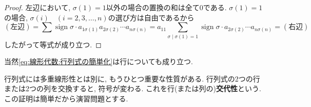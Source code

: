 \documentclass[a4j,dvipdfmx]{jsarticle}
\numberwithin{equation}{section}
\newcommand{\sign}{\mathop{\mathrm{sign}}\nolimits}
\begin{document}
            \begin{proof}
                左辺において, $\sigma(1)=1$以外の場合の置換の和は全て0である. $\sigma(1)=1$の場合, $\sigma(i)\quad(i=2,3,\dots,n)$の選び方は自由であるから
                \begin{equation*}
                    (左辺)=\sum\sign\sigma\cdot a_{1\sigma(1)}a_{2\sigma(2)}\cdots a_{n\sigma(n)}=a_{11}\sum_{\sigma\mid\sigma(1)=1}\sign\sigma\cdot a_{2\sigma(2)}\cdots a_{n\sigma(n)}=(右辺)
                \end{equation*}
                したがって等式が成り立つ.
            \end{proof}
            当然\eqref{eq:線形代数:行列式の簡単化}は行についても成り立つ. 

            行列式には多重線形性とは別に, もうひとつ重要な性質がある. 行列式の2つの行または2つの列を交換すると, 符号が変わる. これを行(または列の)\textbf{交代性}という.
            この証明は簡単だから演習問題とする.\\
\end{document}
